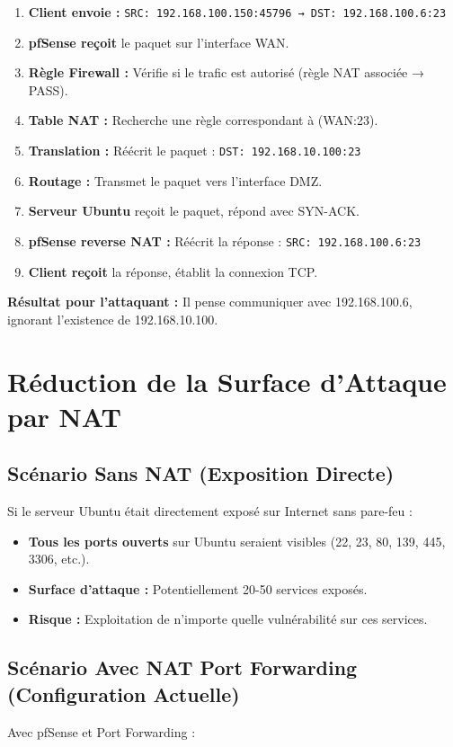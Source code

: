 \documentclass[12pt,a4paper,openany]{report}
\begin{document}
	\begin{enumerate}
		\item \textbf{Client envoie :} \texttt{SRC: 192.168.100.150:45796 → DST: 192.168.100.6:23}
		\item \textbf{pfSense reçoit} le paquet sur l'interface WAN.
		\item \textbf{Règle Firewall :} Vérifie si le trafic est autorisé (règle NAT associée → PASS).
		\item \textbf{Table NAT :} Recherche une règle correspondant à (WAN:23).
		\item \textbf{Translation :} Réécrit le paquet : \texttt{DST: 192.168.10.100:23}
		\item \textbf{Routage :} Transmet le paquet vers l'interface DMZ.
		\item \textbf{Serveur Ubuntu} reçoit le paquet, répond avec SYN-ACK.
		\item \textbf{pfSense reverse NAT :} Réécrit la réponse : \texttt{SRC: 192.168.100.6:23}
		\item \textbf{Client reçoit} la réponse, établit la connexion TCP.
	\end{enumerate}
	
	\textbf{Résultat pour l'attaquant :} Il pense communiquer avec 192.168.100.6, ignorant l'existence de 192.168.10.100.
	
	\section{Réduction de la Surface d'Attaque par NAT}
	
	\subsection{Scénario Sans NAT (Exposition Directe)}
	Si le serveur Ubuntu était directement exposé sur Internet sans pare-feu :
	
	\begin{itemize}
		\item \textbf{Tous les ports ouverts} sur Ubuntu seraient visibles (22, 23, 80, 139, 445, 3306, etc.).
		\item \textbf{Surface d'attaque :} Potentiellement 20-50 services exposés.
		\item \textbf{Risque :} Exploitation de n'importe quelle vulnérabilité sur ces services.
	\end{itemize}
	
	\subsection{Scénario Avec NAT Port Forwarding (Configuration Actuelle)}
	Avec pfSense et Port Forwarding :
	
\end{document}
